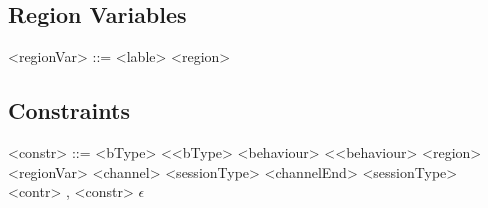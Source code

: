 \documentclass[12pt]{article}
\begin{document}
\subsection {Region Variables}

\begin{grammar}

<regionVar> ::= <lable>
\alt <region>

\end{grammar}

\subsection{Constraints}

\begin{grammar}

<constr> ::= <bType> \textless <bType>
\alt <behaviour> \textless <behaviour>
\alt <region> \texttildelow <regionVar>
\alt <channel> \texttildelow <sessionType>
\alt <channelEnd> \texttildelow <sessionType>
\alt <contr> , <constr>
\alt $\epsilon$

\end{grammar}
\end{document}
